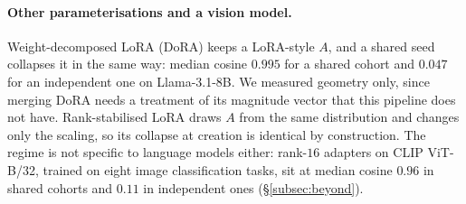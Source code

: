 \paragraph{Other parameterisations and a vision model.} Weight-decomposed LoRA
(DoRA) keeps a LoRA-style $A$, and a shared seed collapses it in the same way:
median cosine $0.995$ for a shared cohort and $0.047$ for an independent one
on Llama-3.1-8B. We measured geometry only, since merging DoRA needs a
treatment of its magnitude vector that this pipeline does not have. Rank-stabilised
LoRA draws $A$ from the same distribution and changes only the scaling, so its
collapse at creation is identical by construction. The regime is not specific
to language models either: rank-$16$ adapters on CLIP ViT-B/32, trained on
eight image classification tasks, sit at median cosine $0.96$ in shared
cohorts and $0.11$ in independent ones (\S\ref{subsec:beyond}).
